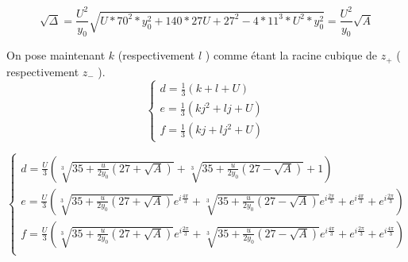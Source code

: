 \documentclass[12pt]{article}
\begin{document}
\begin{equation}
 \sqrt{\Delta} = \frac{U^2}{y_0} \sqrt{U*70^2*y_0^2+ 140*27U+27^2 -4*11^3*U^2*y_0^2} = \frac{U^2}{y_0} \sqrt{A}
\end{equation}

On pose maintenant $k$ (respectivement $l$ ) comme \'etant la racine cubique de $z_+$ ( respectivement $z_-$ ). 
\begin{equation}
\left\{ \begin{array}{rl}
d = \frac{1}{3} ( k + l + U)\\
e = \frac{1}{3} (kj^2 + lj + U)\\
f = \frac{1}{3} (kj + lj^2 + U)
\end{array} \right.
\end{equation} 


\begin{equation}
\left\{ \begin{array}{rl}
d = \frac{U}{3} ( \sqrt[3]{35+\frac{u}{2y_0}(27 + \sqrt{A})}+\sqrt[3]{35+\frac{u}{2y_0}(27 - \sqrt{A})} + 1)\\
e = \frac{U}{3} (\sqrt[3]{35+\frac{u}{2y_0}(27 + \sqrt{A})} e^{i\frac{4\pi}{3}}  +   \sqrt[3]{35+\frac{u}{2y_0}(27 - \sqrt{A})}e^{i \frac{2\pi}{3}} 
+ e^{i\frac{4\pi}{3}} + e^{i\frac{2\pi}{3}} )\\
f = \frac{U}{3} (\sqrt[3]{35+\frac{u}{2y_0}(27 + \sqrt{A})} e^{i\frac{2\pi}{3}}  +   \sqrt[3]{35+\frac{u}{2y_0}(27 - \sqrt{A})}e^{i \frac{4\pi}{3}} 
+ e^{i\frac{2\pi}{3}} + e^{i\frac{4\pi}{3}} )\\
\end{array} \right.
\end{equation}
\end{document}

